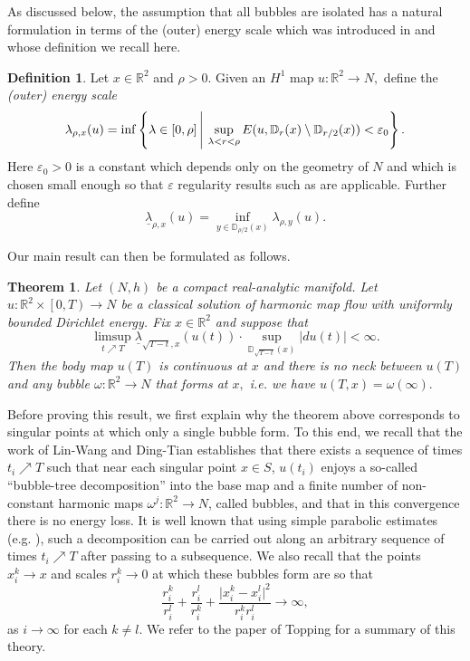 \documentclass[10pt,reqno]{amsart}
\theoremstyle{plain}
\newtheorem{thm}[lemma]{Theorem}
\theoremstyle{definition}
\newtheorem{defn}[lemma]{Definition}
\numberwithin{equation}{section}
\newcommand{\om}{\omega}
\newcommand{\D}{\mathbb{D}}
\newcommand{\R}{\ensuremath{{\mathbb R}}}
\newcommand{\beq}{\begin{equation}}
\newcommand{\eeq}{\end{equation}}
\newcommand{\abs}[1]{\vert#1\vert}
\newcommand{\eps}{\varepsilon}
\begin{document}
As discussed below, the assumption that all bubbles are isolated has a natural formulation in terms of the (outer) energy scale which was introduced in 
 \cite[Definition 4.2]{songwaldron} and whose definition we recall here.
\begin{defn}
Let $x\in \R^2$ and $\rho > 0.$ Given an $H^1$ map $u: \R^2 \to N,$  define the \emph{(outer) energy scale} %
\begin{equation}\label{lambdadef}
\lambda_{\rho, x}(u) = \inf \left\{ \lambda \in [0,\rho] \,\, \vrule \,\, \sup_{\lambda<r<\rho} E( u, \D_r(x)\setminus \D_{r/2}(x) ) < \eps_0 \right\}.
\end{equation}
Here $\eps_0 > 0$ is a constant  which depends only on the geometry of $N$ and which is chosen small enough so that $\eps$ regularity results such as \cite[Theorem 3.4]{songwaldron} are applicable.  
Further define
\begin{equation*}
    \underline{\lambda}_{\rho, x}(u) = \inf_{y \in \D_{\rho / 2}(x)} \lambda_{\rho,y}(u).
\end{equation*}
\end{defn}


Our main result can then be formulated as follows. 


\begin{thm}\label{thm:main} Let $(N, h)$ be a compact real-analytic manifold. Let $u : \R^2 \times \left[ 0, T \right) \to N$ be a classical solution of harmonic map flow with uniformly bounded Dirichlet energy.
Fix $x \in \R^2$ and suppose that
\begin{equation}\label{main:assumption}
    \limsup_{t \nearrow T} \underline{\lambda}_{\sqrt{T - t}, x}(u(t)) \cdot \sup_{\D_{\sqrt{T - t}}(x)} |du(t)| < \infty.
\end{equation}
Then the body map $u(T)$ is continuous at $x$ and there is no neck between $u(T)$ and any bubble $\om:\R^2\to N$ that forms at $x,$ i.e. we have $u(T,x)=\om(\infty).$
\end{thm}


Before proving this result, we first explain why the theorem above corresponds to singular points at which only a single bubble form. To this end, we recall that the work of Lin-Wang \cite{linwangenergyidentity} and Ding-Tian \cite{dingtian} establishes that there exists a sequence of times $t_i \nearrow T$ such that near each singular point $x\in S$, $u(t_i)$ enjoys a so-called ``bubble-tree decomposition'' into the base map and a finite number of non-constant harmonic maps $\om^j:\R^2\to N$, called bubbles, and that in this convergence there is no energy loss. 
It is well known that using simple parabolic estimates (e.g. \cite[Theorem 3.4]{songwaldron}), such a decomposition can be carried out along an arbitrary sequence of times $t_i \nearrow T$ after passing to a subsequence. We also recall that the points $x_i^k\to x$ and scales $r_i^k\to 0$ at which these bubbles form are so that 
\beq\label{est:bubbling}
\frac{r_i^k}{r_i^l} + \frac{r_i^l}{r_i^k} + \frac{\abs{x_i^k - x_i^l}^2}{r_i^k r_i^l} \to \infty ,
\eeq
as $i \to \infty$ for each $k \neq l$. 
We refer to the paper of Topping \cite{toppingannals} for a summary of this theory. 
\end{document}
